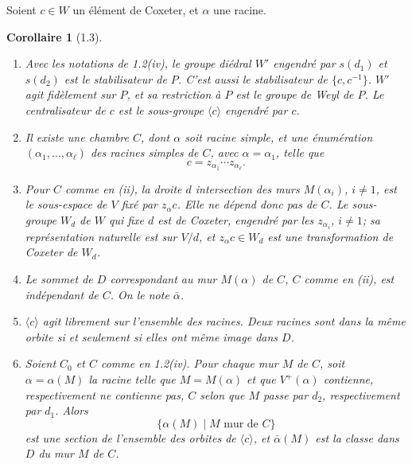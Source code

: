 \documentclass[11pt]{article}
\theoremstyle{plainfr}
\newtheorem*{corollaire}{Corollaire}
\begin{document}
Soient $c\in W$ un élément de Coxeter, et $\alpha$ une racine.

\begin{corollaire}[1.3]
\begin{enumerate}[label=(\roman*),leftmargin=2.2em]
\item Avec les notations de 1.2(iv), le groupe diédral $W'$ engendré par $s(d_1)$ et $s(d_2)$ est le stabilisateur de $P$. C'est aussi le stabilisateur de $\{c,c^{-1}\}$. $W'$ agit fidèlement sur $P$, et sa restriction à $P$ est le groupe de Weyl de $P$. Le centralisateur de $c$ est le sous-groupe $\langle c\rangle$ engendré par $c$.

\item Il existe une chambre $C$, dont $\alpha$ soit racine simple, et une énumération $(\alpha_1,\ldots,\alpha_\ell)$ des racines simples de $C$, avec $\alpha=\alpha_1$, telle que
\[
 c=z_{\alpha_1}\cdots z_{\alpha_\ell}.
\]

\item Pour $C$ comme en (ii), la droite $d$ intersection des murs $M(\alpha_i)$, $i\ne 1$, est le sous-espace de $V$ fixé par $z_\alpha c$. Elle ne dépend donc pas de $C$. Le sous-groupe $W_d$ de $W$ qui fixe $d$ est de Coxeter, engendré par les $z_{\alpha_i}$, $i\ne 1$; sa représentation naturelle est sur $V/d$, et $z_\alpha c\in W_d$ est une transformation de Coxeter de $W_d$.

\item Le sommet de $D$ correspondant au mur $M(\alpha)$ de $C$, $C$ comme en (ii), est indépendant de $C$. On le note $\bar\alpha$.

\item $\langle c\rangle$ agit librement sur l'ensemble des racines. Deux racines sont dans la même orbite si et seulement si elles ont même image dans $D$.

\item Soient $C_0$ et $C$ comme en 1.2(iv). Pour chaque mur $M$ de $C$, soit $\alpha=\alpha(M)$ la racine telle que $M=M(\alpha)$ et que $V^+(\alpha)$ contienne, respectivement ne contienne pas, $C$ selon que $M$ passe par $d_2$, respectivement par $d_1$. Alors
\[
 \{\alpha(M)\mid M\text{ mur de }C\}
\]
est une section de l'ensemble des orbites de $\langle c\rangle$, et $\bar\alpha(M)$ est la classe dans $D$ du mur $M$ de $C$.
\end{enumerate}
\end{corollaire}
\end{document}
